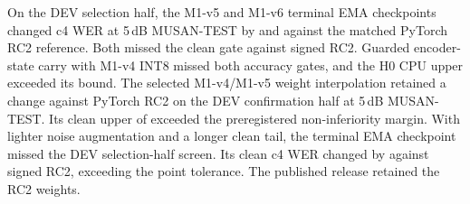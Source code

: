  On the DEV selection half, the M1-v5
and M1-v6 terminal EMA checkpoints changed c4 WER at 5\,dB MUSAN-TEST
by \WaveNoiseFiveDelta\pp{} and \WaveNoiseSixDelta\pp{} against the
matched PyTorch RC2 reference. Both missed the clean gate against signed
RC2. Guarded encoder-state carry with M1-v4 INT8 missed both accuracy
gates, and the H0 CPU upper exceeded its bound. The selected M1-v4/M1-v5
weight interpolation retained a \WaveSoupNoiseDelta\pp{} change against
PyTorch RC2 on the DEV confirmation half at 5\,dB MUSAN-TEST. Its clean
upper of \WaveSoupCleanUpper\pp{} exceeded the preregistered
\WaveSoupCleanMargin\pp{} non-inferiority margin.
With lighter noise augmentation and a longer clean tail, the terminal EMA
checkpoint missed the DEV selection-half screen. Its clean c4 WER changed
by \WaveLightCleanDelta\pp{} against signed RC2, exceeding the
\WaveLightCleanMargin\pp{} point tolerance. The published release retained
the RC2 weights.
